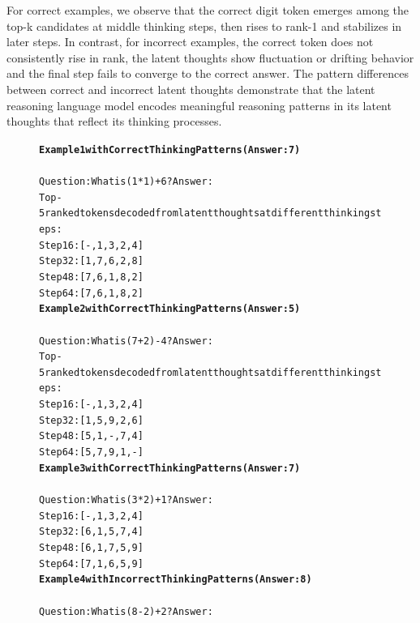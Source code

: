 \documentclass{article} %
\begin{document}
For correct examples, we observe that the correct digit token emerges among the top-k candidates at middle thinking steps, then rises to rank-1 and stabilizes in later steps. In contrast, for incorrect examples, the correct token does not consistently rise in rank, the latent thoughts show fluctuation or drifting behavior and the final step fails to converge to the correct answer. The pattern differences between correct and incorrect latent thoughts demonstrate that the latent reasoning language model encodes meaningful reasoning patterns in its latent thoughts that reflect its thinking processes.
\begin{figure}
\begin{AIBox}{}
\parbox[t]{\textwidth}{
\small\begin{alltt}
\textbf{Example 1 with Correct Thinking Patterns (Answer: 7) }\\
\\
Question: What is (1 * 1) + 6? Answer:\\
Top-5 ranked tokens decoded from latent thoughts at different thinking steps:\\
Step 16: [-, 1, 3, 2, 4]\\
Step 32: [1, 7, 6, 2, 8]\\
Step 48: [7, 6, 1, 8, 2]\\
Step 64: [7, 6, 1, 8, 2]
\tcbline
\textbf{Example 2 with Correct Thinking Patterns (Answer: 5)}\\
\\
Question: What is (7 + 2) - 4? Answer:\\
Top-5 ranked tokens decoded from latent thoughts at different thinking steps:\\
Step 16: [-, 1, 3, 2, 4]\\
Step 32: [1, 5, 9, 2, 6]\\
Step 48: [5, 1, -, 7, 4]\\
Step 64: [5, 7, 9, 1, -]
\tcbline
\textbf{Example 3 with Correct Thinking Patterns (Answer: 7)}\\
\\
Question: What is (3 * 2) + 1? Answer:\\
Step 16: [-, 1, 3, 2, 4]\\
Step 32: [6, 1, 5, 7, 4]\\
Step 48: [6, 1, 7, 5, 9]\\
Step 64: [7, 1, 6, 5, 9]
\tcbline
\textbf{Example 4 with Incorrect Thinking Patterns (Answer: 8)}\\
\\
Question: What is (8 - 2) + 2? Answer:\\

\end{alltt}}
\end{AIBox}
\end{figure}
\end{document}
